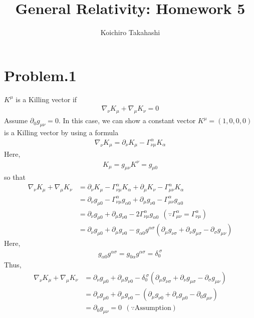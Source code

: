 \documentclass[12pt]{article}
\begin{document}
\title{General Relativity: Homework 5}
\author{Koichiro Takahashi}
\maketitle

\section*{Problem.1}
$K^{\mu}$ is a Killing vector if
\begin{align}
\nabla_{\nu} K_{\mu} + \nabla_{\mu} K_{\nu} = 0
\end{align}
Assume $\partial_0 g_{\mu \nu} = 0$. In this case, we can show a constant vector $K^{\mu} = \left(1, 0, 0, 0\right)$ is a Killing vector by using a formula
\begin{align}
\nabla_{\nu} K_{\mu} = \partial_{\nu} K_{\mu} - \Gamma^{\alpha}_{\nu \mu} K_{\alpha}
\end{align}
Here, 
\begin{align}
K_{\mu} = g_{\mu \nu} K^{\nu} = g_{\mu 0}
\end{align}
so that
\begin{align}
\nabla_{\nu} K_{\mu} + \nabla_{\mu} K_{\nu} &= \partial_{\nu} K_{\mu} - \Gamma^{\alpha}_{\nu \mu} K_{\alpha} + \partial_{\mu} K_{\nu} - \Gamma^{\alpha}_{\mu \nu} K_{\alpha}\\
&= \partial_{\nu} g_{\mu 0} - \Gamma^{\alpha}_{\nu \mu} g_{\alpha 0} + \partial_{\mu} g_{\nu 0} - \Gamma^{\alpha}_{\mu \nu} g_{\alpha 0} \\
&= \partial_{\nu} g_{\mu 0} + \partial_{\mu} g_{\nu 0} - 2 \Gamma^{\alpha}_{\nu \mu} g_{\alpha 0} ~~\left(\because \Gamma^{\alpha}_{\mu \nu} = \Gamma^{\alpha}_{\nu \mu} \right)\\
&= \partial_{\nu} g_{\mu 0} + \partial_{\mu} g_{\nu 0} - g_{\alpha 0} g^{\alpha \sigma} \left( \partial_{\mu} g_{\nu \sigma} + \partial_{\nu} g_{\mu \sigma} - \partial_{\sigma} g_{\mu \nu} \right)
\end{align}
Here, 
\begin{align}
g_{\alpha 0} g^{\alpha \sigma} = g_{0 \alpha} g^{\alpha \sigma}  = \delta_{0}^{~\sigma}
\end{align}
Thus,
\begin{align}
\nabla_{\nu} K_{\mu} + \nabla_{\mu} K_{\nu} &= \partial_{\nu} g_{\mu 0} + \partial_{\mu} g_{\nu 0} - \delta_{0}^{~\sigma} \left( \partial_{\mu} g_{\nu \sigma} + \partial_{\nu} g_{\mu \sigma} - \partial_{\sigma} g_{\mu \nu} \right)\\
&= \partial_{\nu} g_{\mu 0} + \partial_{\mu} g_{\nu 0} - \left( \partial_{\mu} g_{\nu 0} + \partial_{\nu} g_{\mu 0} - \partial_{0} g_{\mu \nu} \right)\\
&= \partial_{0} g_{\mu \nu} = 0 ~~\left(\because \mathrm{Assumption} \right)
\end{align}
\end{document}
